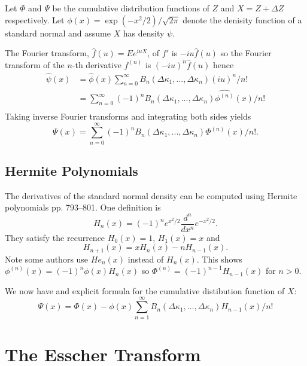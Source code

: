 \documentclass[11pt]{article}
\theoremstyle{definition}
\begin{document}
Let \(\Phi\) and \(\Psi\) be the cumulative distribution functions of
\(Z\) and \(X = Z + \Delta Z\) respectively. 
Let \(\phi(x) = \exp(-x^2/2)/\sqrt{2\pi}\) denote
the denisity function of a standard normal
and assume \(X\) has density \(\psi\).

The Fourier transform, \(\hat{f}(u) = Ee^{iuX}\),
of \(f'\) is \(-iu \hat f(u)\) so
the Fourier transform of the \(n\)-th derivative
\(f^{(n)}\) is \((-iu)^n\hat f(u)\) hence
\begin{align*}
	\hat{\psi}(x) &= \hat{\phi}(x)\sum_{n=0}^\infty 
 B_n(\Delta\kappa_1,...,\Delta\kappa_n)
	(iu)^n/n!\\
&= \sum_{n=0}^\infty (-1)^n B_n(\Delta\kappa_1,...,\Delta\kappa_n)
	\widehat{\phi^{(n)}}(x)/n!\\
\end{align*}
Taking inverse Fourier transforms and integrating both
sides yields
\begin{equation}
\Psi(x) = \sum_{n=0}^\infty (-1)^n B_n(\Delta\kappa_1,...,\Delta\kappa_n) \Phi^{(n)}(x)/n!.
\end{equation}

\subsection{Hermite Polynomials}
The derivatives of the standard normal density 
can be computed using Hermite polynomials\cite{AbrSte1964}
pp. 793--801.
One definition is
\[
H_n(x) = (-1)^n e^{x^2/2}\frac{d^n}{dx^n}e^{-x^2/2}.
\]
They satisfy the recurrence \(H_0(x) = 1\), \(H_1(x) = x\) and
\[
H_{n+1}(x) = xH_n(x) - n H_{n-1}(x).
\]
Note some authors use \(He_n(x)\) instead of \(H_n(x)\).
This shows \(\phi^{(n)}(x) = (-1)^n\phi(x) H_n(x)\)
so \(\Phi^{(n)} = (-1)^{n-1} H_{n-1}(x)\) for \(n > 0\).

We now have and explicit formula for the cumulative
distibution function of \(X\):
\begin{equation}
\Psi(x) = \Phi(x) - \phi(x)\sum_{n=1}^\infty
B_n(\Delta\kappa_1,\dots,\Delta\kappa_n) H_{n-1}(x)/n!
\end{equation}

\section{The Esscher Transform}
\end{document}
